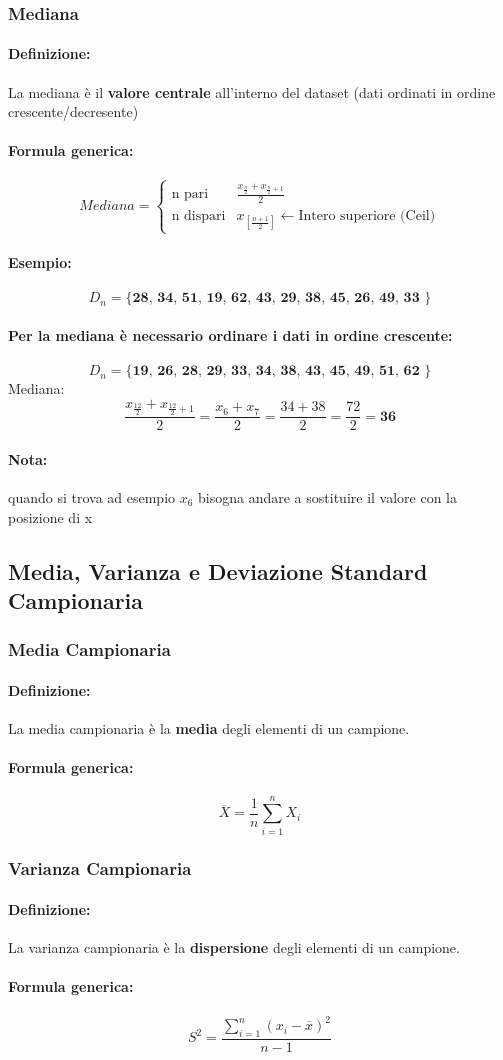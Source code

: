 \documentclass[]{article}
\newcommand{\definizione}{\paragraph{Definizione:}}
\newcommand{\formula}{\paragraph{Formula generica:}}
\begin{document}
    \subsubsection{Mediana}
    \definizione La mediana è il \textbf{valore centrale} all'interno del dataset (dati ordinati in ordine crescente/decresente)
    \formula
    \begin{equation*}
        Mediana =
        \begin{cases}
            \text{n pari} &  \frac{x_\frac{n}{2} + x_{\frac{n}{2}+ 1}}{2} \\
            \text{n dispari} & x_{[\frac{n+1}{2}]} \leftarrow \text{Intero superiore (Ceil)}
        \end{cases}
    \end{equation*}
    \paragraph{Esempio:} \[ D_n = \textbf{\{ 28, 34, 51, 19, 62, 43, 29, 38, 45, 26, 49, 33 \}} \]
    \paragraph{Per la mediana è necessario ordinare i dati in ordine crescente:} \[ D_n = \textbf{\{ 19, 26, 28, 29, 33, 34, 38, 43, 45, 49, 51, 62 \}} \]
    Mediana: \[ \frac{x_{\frac{12}{2}} + x_{\frac{12}{2} + 1}}{2} = \frac{x_6 + x_7}{2} = \frac{34 + 38}{2} = \frac{72}{2} = \textbf{36} \]
    \paragraph{Nota:} quando si trova ad esempio $x_6$ bisogna andare a sostituire il valore con la posizione di x



    \subsection{Media, Varianza e Deviazione Standard Campionaria}
    \subsubsection{Media Campionaria}
    \definizione La media campionaria è la \textbf{media} degli elementi di un campione.
    \formula  \[ \overline{X} = \frac{1}{n} \sum_{i=1}^{n} X_i \]

    \subsubsection{Varianza Campionaria}
    \definizione La varianza campionaria è la \textbf{dispersione} degli elementi di un campione.
    \formula \[ S^2 = \frac{\sum_{i = 1}^{n} (x_i - \overline{x})^2}{n-1} \]
\end{document}
